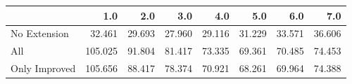 \begin{tabular}{lrrrrrrr}
\toprule
{} &     1.0 &    2.0 &    3.0 &    4.0 &    5.0 &    6.0 &    7.0 \\
\midrule
No Extension  &  32.461 & 29.693 & 27.960 & 29.116 & 31.229 & 33.571 & 36.606 \\
All           & 105.025 & 91.804 & 81.417 & 73.335 & 69.361 & 70.485 & 74.453 \\
Only Improved & 105.656 & 88.417 & 78.374 & 70.921 & 68.261 & 69.964 & 74.388 \\
\bottomrule
\end{tabular}
